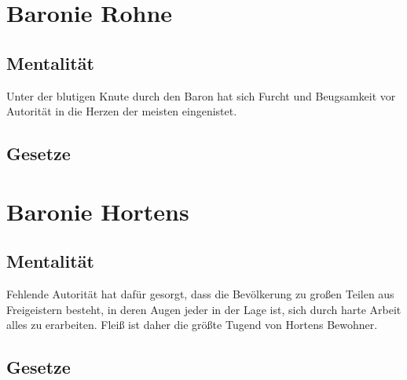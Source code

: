 \documentclass[a4paper,12pt,oneside]{book}
\begin{document}
\section{Baronie Rohne}
\subsection{Mentalität}
Unter der blutigen Knute durch den Baron hat sich Furcht und Beugsamkeit vor Autorität in die Herzen der meisten eingenistet.  
\subsection{Gesetze}
 
\section{Baronie Hortens}
\subsection{Mentalität}
Fehlende Autorität hat dafür gesorgt, dass die Bevölkerung zu großen Teilen aus Freigeistern besteht, in deren Augen jeder in der Lage ist, sich durch harte Arbeit alles zu erarbeiten. Fleiß ist daher die größte Tugend von Hortens Bewohner.
\subsection{Gesetze}
\end{document}
